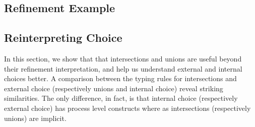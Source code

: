 \documentclass[a4paper,USenglish]{lipics-v2016}
\newcommand\lab{lab}
\begin{document}


\subsection{Refinement Example}


\subsection{Reinterpreting Choice}

In this section, we show that that intersections and unions are useful beyond their refinement interpretation, and help us understand external and internal choices better. A comparison between the typing rules for intersections and external choice (respectively unions and internal choice) reveal striking similarities. The only difference, in fact, is that internal choice (respectively external choice) has process level constructs where as intersections (respectively unions) are implicit. 
\end{document}
